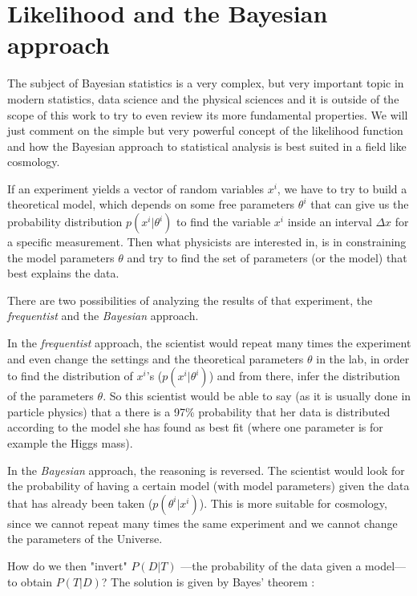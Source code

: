 \section{Likelihood and the Bayesian approach}

The subject of Bayesian statistics is a very complex, but very important topic in modern
statistics, data science and the physical sciences \cite{cite Gregory and others}
and it is outside of the scope of this work to try to even review its more fundamental properties.
We will just comment on the simple but very powerful concept of the likelihood function and how the Bayesian
approach to statistical analysis is best suited in a field like cosmology.

If an experiment yields a vector of random variables $x^i$, 
we have to
try to build a theoretical model, which depends on some free parameters $\theta^i$ 
that can give us the probability distribution $p(x^i | \theta^i)$ to find the variable $x^i$ 
inside an interval $\Delta x$ for a specific measurement.
Then what physicists are interested in, is in constraining the model parameters $\theta$ and try to find
the set of parameters (or the model) that best explains the data.

There are two possibilities of analyzing the results of that experiment, the \emph{frequentist}
and the \emph{Bayesian} approach.

In the \emph{frequentist} approach, the scientist would repeat many times the experiment and even change
the settings and the theoretical parameters $\theta$ in the lab, in order to find the distribution
of $x^i$'s ($p(x^i | \theta^i)$) and from there, infer the distribution of the parameters $\theta$. So this scientist would
be able to say (as it is usually done in particle physics) that a there is a 97\% probability that her 
data is distributed according to the model she has found as best fit (where one parameter is for example the Higgs mass).

In the \emph{Bayesian} approach, the reasoning is reversed. The scientist would look for the probability
of having a certain model (with model parameters) given the data that has already been taken ($p(\theta^i | x^i)$). This is more suitable
for cosmology, since we cannot repeat many times the same experiment and we cannot change
the parameters of the Universe.

How do we then "invert" $P(D | T)$ ---the probability of the data given a model--- to obtain $P(T | D)$? The solution is given by 
Bayes' theorem \cite{Bayes, Dodelson, Luca, many}:

